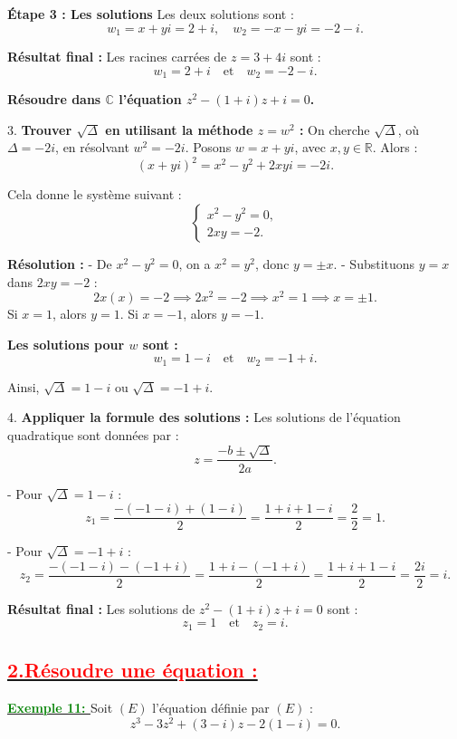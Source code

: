 \documentclass[12pt,a4paper]{article}
\begin{document}
\textbf{Étape 3 : Les solutions}  
Les deux solutions sont :
\[
w_1 = x + yi = 2 + i, \quad w_2 = -x - yi = -2 - i.
\]

\textbf{Résultat final :}  
Les racines carrées de \( z = 3 + 4i \) sont :
\[
w_1 = 2 + i \quad \text{et} \quad w_2 = -2 - i.
\]

\textbf{Résoudre dans \( \mathbb{C} \) l’équation \( z^2 - (1 + i)z + i = 0 \).}

3. \textbf{Trouver \( \sqrt{\Delta} \) en utilisant la méthode \( z = w^2 \) :}  
On cherche \( \sqrt{\Delta} \), où \( \Delta = -2i \), en résolvant \( w^2 = -2i \).  
Posons \( w = x + yi \), avec \( x, y \in \mathbb{R} \). Alors :
\[
(x + yi)^2 = x^2 - y^2 + 2xyi = -2i.
\]

Cela donne le système suivant :
\[
\begin{cases}
x^2 - y^2 = 0, \\
2xy = -2.
\end{cases}
\]

\textbf{Résolution :}
- De \( x^2 - y^2 = 0 \), on a \( x^2 = y^2 \), donc \( y = \pm x \).
- Substituons \( y = x \) dans \( 2xy = -2 \) :
  \[
  2x(x) = -2 \implies 2x^2 = -2 \implies x^2 = 1 \implies x = \pm 1.
  \]
  Si \( x = 1 \), alors \( y = 1 \).  
  Si \( x = -1 \), alors \( y = -1 \).

\textbf{Les solutions pour \( w \) sont :}
\[
w_1 = 1 - i \quad \text{et} \quad w_2 = -1 + i.
\]

Ainsi, \( \sqrt{\Delta} = 1 - i \) ou \( \sqrt{\Delta} = -1 + i \).

4. \textbf{Appliquer la formule des solutions :}  
Les solutions de l’équation quadratique sont données par :
\[
z = \frac{-b \pm \sqrt{\Delta}}{2a}.
\]

- Pour \( \sqrt{\Delta} = 1 - i \) :
  \[
  z_1 = \frac{-(-1 - i) + (1 - i)}{2} = \frac{1 + i + 1 - i}{2} = \frac{2}{2} = 1.
  \]

- Pour \( \sqrt{\Delta} = -1 + i \) :
  \[
  z_2 = \frac{-(-1 - i) - (-1 + i)}{2} = \frac{1 + i - (-1 + i)}{2} = \frac{1 + i + 1 - i}{2} = \frac{2i}{2} = i.
  \]

\textbf{Résultat final :}  
Les solutions de \( z^2 - (1 + i)z + i = 0 \) sont :
\[
z_1 = 1 \quad \text{et} \quad z_2 = i.
\]
\subsection*{\underline{\textbf{\textcolor{red}{2.Résoudre une équation :}}}}
\underline{\textbf{\textcolor{green}{Exemple 11: }}}
Soit $(E)$ l’équation définie par $(E)$ : 
\[
z^3 - 3z^2 + (3 - i)z - 2(1 - i) = 0.
\]
\end{document}
